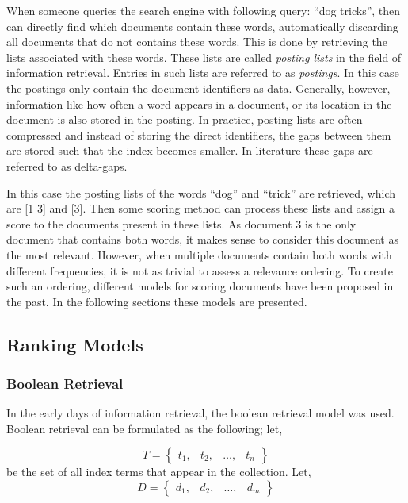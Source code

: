 When someone queries the search engine with following query: ``dog tricks'', then can directly find which documents contain these words, automatically discarding all documents that do not contains these words. This is done by retrieving the lists associated with these words. These lists are called \emph{posting lists} in the field of information retrieval. Entries in such lists are referred to as \emph{postings}. In this case the postings only contain the document identifiers as data. Generally, however, information like how often a word appears in a document, or its location in the document is also stored in the posting. In practice, posting lists are often compressed and instead of storing the direct identifiers, the gaps between them are stored such that the index becomes smaller. In literature these gaps are referred to as delta-gaps. 

In this case the posting lists of the words ``dog'' and ``trick'' are retrieved, which are [1 3] and [3]. Then some scoring method can process these lists and assign a score to the documents present in these lists. As document 3 is the only document that contains both words, it makes sense to consider this document as the most relevant. However, when multiple documents contain both words with different frequencies, it is not as trivial to assess a relevance ordering. 
To create such an ordering, different models for scoring documents have been proposed in the past. In the following sections these models are presented.

\subsection{Ranking Models}

\subsubsection{Boolean Retrieval}
In the early days of information retrieval, the boolean retrieval model was used. Boolean retrieval can be formulated as the following; let, 

\begin{equation}
	T = \begin{Bmatrix}
		t_1, & t_2, & \ldots, & t_n
	\end{Bmatrix}
\end{equation}
be the set of all index terms that appear in the collection. Let,
\begin{equation}
	D = \begin{Bmatrix}
		d_1, & d_2, & \ldots, & d_m
	\end{Bmatrix}
\end{equation}

